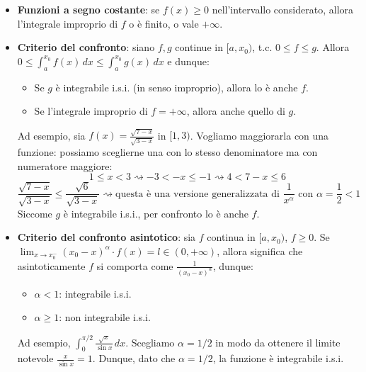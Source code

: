\documentclass[12pt]{report}
\begin{document}
	\begin{itemize}
		
		\item \textbf{Funzioni a segno costante}: se $f(x) \geq 0$ nell'intervallo considerato, allora l'integrale improprio di $f$ o è finito, o vale $+\infty$.
		
		\item \textbf{Criterio del confronto}: siano $f, g$ continue in $[a, x_0)$, t.c. $0 \leq f \leq g$. Allora $0 \leq \int_{a}^{x_0} f(x) \, dx \leq \int_{a}^{x_0} g(x) \, dx$ e dunque:
		\begin{itemize}
			
			\item Se $g$ è integrabile i.s.i. (in senso improprio), allora lo è anche $f$.
			
			\item Se l'integrale improprio di $f = +\infty$, allora anche quello di $g$.
			
		\end{itemize}
		
		Ad esempio, sia $f(x) = \frac{\sqrt{7-x}}{\sqrt{3-x}}$ in $[1, 3)$. Vogliamo maggiorarla con una funzione: possiamo sceglierne una con lo stesso denominatore ma con numeratore maggiore:
		\[
		1 \leq x < 3 \rightsquigarrow -3 < -x \leq -1 \rightsquigarrow 4 < 7-x \leq 6
		\]
		\[
		\frac{\sqrt{7-x}}{\sqrt{3-x}} \leq \frac{\sqrt{6}}{\sqrt{3-x}} \rightsquigarrow \text{questa è una versione generalizzata di } \frac{1}{x^\alpha} \text{ con } \alpha = \frac{1}{2} < 1
		\]
		Siccome $g$ è integrabile i.s.i., per confronto lo è anche $f$.
		
		\item \textbf{Criterio del confronto asintotico}: sia $f$ continua in $[a, x_0)$, $f \geq 0$. Se $\lim_{x \to x_0^-} (x_0 - x)^\alpha \cdot f(x) = l \in (0, +\infty)$, allora significa che asintoticamente $f$ si comporta come $\frac{1}{(x_0 - x)^\alpha}$, dunque:
		\begin{itemize}
			
			\item $\alpha < 1$: integrabile i.s.i.
			
			\item $\alpha \geq 1$: non integrabile i.s.i.
			
		\end{itemize}
		
		Ad esempio, $\int_{0}^{\pi/2} \frac{\sqrt{x}}{\sin x} \, dx$. Scegliamo $\alpha = 1/2$ in modo da ottenere il limite notevole $\frac{x}{\sin x} = 1$. Dunque, dato che $\alpha = 1/2$, la funzione è integrabile i.s.i.
		
	\end{itemize}
	
\end{document}
